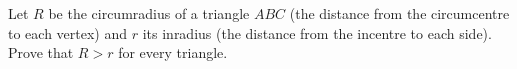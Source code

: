 Let $R$ be the circumradius of a triangle $ABC$ (the distance from the circumcentre to each vertex) and $r$ its inradius (the distance from the incentre to each side). Prove that $R>r$ for every triangle.
